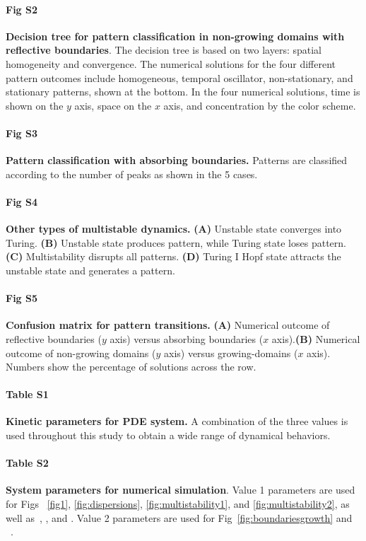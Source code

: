 \documentclass[10pt,letterpaper]{article}
\begin{document}
    
\paragraph*{Fig S2}
\label{sup_fig2}
{\bf Decision tree for pattern classification in non-growing domains with reflective boundaries}. The decision tree is based on two layers: spatial homogeneity and convergence. The numerical solutions for the four different pattern outcomes include homogeneous, temporal oscillator, non-stationary, and stationary patterns, shown at the bottom. In the four numerical solutions, time is shown on the $y$ axis, space on the $x$ axis, and concentration by the color scheme.

\paragraph*{Fig S3}
\label{sup_fig3}
{\bf Pattern classification with absorbing boundaries.} Patterns are classified according to the number of peaks as shown in the 5 cases. 


\paragraph*{Fig S4}
\label{sup_fig4}
{\bf Other types of multistable dynamics.} \textbf{(A)} Unstable state converges into Turing. \textbf{(B)} Unstable state produces pattern, while Turing state loses pattern. \textbf{(C)} Multistability disrupts all patterns. \textbf{(D)} Turing I Hopf state attracts the unstable state and generates a pattern.


\paragraph*{Fig S5}
\label{sup_fig5}
{\bf Confusion matrix for pattern transitions.} \textbf{(A)} Numerical outcome of reflective boundaries ($y$ axis) versus absorbing boundaries ($x$ axis).\textbf{(B)} Numerical outcome of non-growing domains ($y$ axis) versus growing-domains ($x$ axis). Numbers show the percentage of solutions across the row.

\paragraph*{Table S1}
\label{tab:sup_table1}
\textbf{Kinetic parameters for PDE system.} A combination of the three values is used throughout this study to obtain a wide range of dynamical behaviors.

\paragraph*{Table S2}
\label{tab:sup_table2}
\textbf{System parameters for numerical simulation}. Value 1 parameters are used for Figs ~\ref{fig1}, \ref{fig:dispersions}, \ref{fig:multistability1}, and \ref{fig:multistability2}, as well as~, , and . Value 2 parameters are used for Fig~\ref{fig:boundariesgrowth} and ~.
\end{document}
